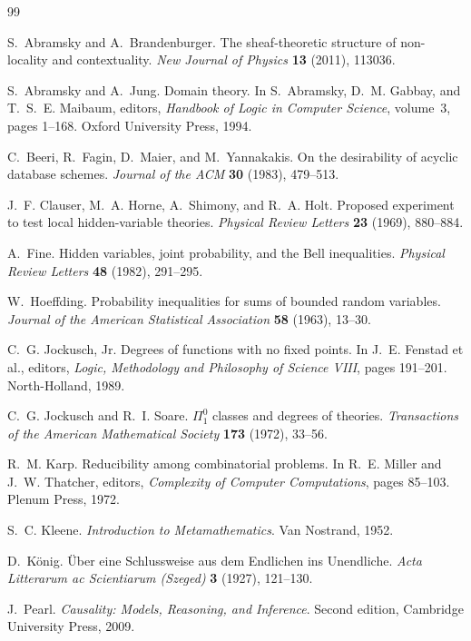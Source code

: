 \documentclass[11pt]{article}
\theoremstyle{plain}
\theoremstyle{definition}
\theoremstyle{remark}
\begin{document}
\begin{thebibliography}{99}

S.~Abramsky and A.~Brandenburger. The sheaf-theoretic structure of non-locality
and contextuality. \emph{New Journal of Physics} \textbf{13} (2011), 113036.

S.~Abramsky and A.~Jung. Domain theory. In S.~Abramsky, D.~M. Gabbay, and
T.~S.~E. Maibaum, editors, \emph{Handbook of Logic in Computer Science},
volume~3, pages 1--168. Oxford University Press, 1994.

C.~Beeri, R.~Fagin, D.~Maier, and M.~Yannakakis. On the desirability of acyclic
database schemes. \emph{Journal of the ACM} \textbf{30} (1983), 479--513.

J.~F. Clauser, M.~A. Horne, A.~Shimony, and R.~A. Holt. Proposed experiment to
test local hidden-variable theories. \emph{Physical Review Letters}
\textbf{23} (1969), 880--884.

A.~Fine. Hidden variables, joint probability, and the Bell inequalities.
\emph{Physical Review Letters} \textbf{48} (1982), 291--295.

W.~Hoeffding. Probability inequalities for sums of bounded random variables.
\emph{Journal of the American Statistical Association} \textbf{58} (1963),
13--30.

C.~G. Jockusch, Jr. Degrees of functions with no fixed points. In
J.~E. Fenstad et al., editors, \emph{Logic, Methodology and Philosophy of
Science VIII}, pages 191--201. North-Holland, 1989.

C.~G. Jockusch and R.~I. Soare. $\Pi^0_1$ classes and degrees of theories.
\emph{Transactions of the American Mathematical Society} \textbf{173} (1972),
33--56.

R.~M. Karp. Reducibility among combinatorial problems. In R.~E. Miller and
J.~W. Thatcher, editors, \emph{Complexity of Computer Computations}, pages
85--103. Plenum Press, 1972.

S.~C. Kleene. \emph{Introduction to Metamathematics}. Van Nostrand, 1952.

D.~K\"onig. \"Uber eine Schlussweise aus dem Endlichen ins Unendliche.
\emph{Acta Litterarum ac Scientiarum (Szeged)} \textbf{3} (1927), 121--130.

J.~Pearl. \emph{Causality: Models, Reasoning, and Inference}. Second edition,
Cambridge University Press, 2009.


\end{thebibliography}
\end{document}
